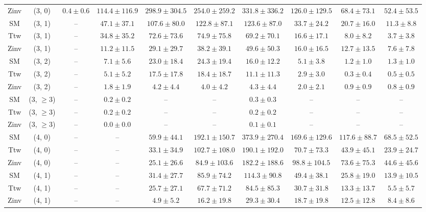 \begin{table}[h!]
{\begin{tabular}{cccccccccc}
	Zinv & (3, 0) & $0.4\pm 0.6$ & $114.4\pm 116.9$ & $298.9\pm 304.5$ & $254.0\pm 259.2$ & $331.8\pm 336.2$ & $126.0\pm 129.5$ & $68.4\pm 73.1$ & $52.4\pm 53.5$ \\[0.5ex] 
	SM & (3, 1) & -- & $47.1\pm 37.1$ & $107.6\pm 80.0$ & $122.8\pm 87.1$ & $123.6\pm 87.0$ & $33.7\pm 24.2$ & $20.7\pm 16.0$ & $11.3\pm 8.8$ \\[0.5ex] 
	Ttw & (3, 1) & -- & $34.8\pm 35.2$ & $72.6\pm 73.6$ & $74.9\pm 75.8$ & $69.2\pm 70.1$ & $16.6\pm 17.1$ & $8.0\pm 8.2$ & $3.7\pm 3.8$ \\[0.5ex] 
	Zinv & (3, 1) & -- & $11.2\pm 11.5$ & $29.1\pm 29.7$ & $38.2\pm 39.1$ & $49.6\pm 50.3$ & $16.0\pm 16.5$ & $12.7\pm 13.5$ & $7.6\pm 7.8$ \\[0.5ex] 
	SM & (3, 2) & -- & $7.1\pm 5.6$ & $23.0\pm 18.4$ & $24.3\pm 19.4$ & $16.0\pm 12.2$ & $5.1\pm 3.8$ & $1.2\pm 1.0$ & $1.3\pm 1.0$ \\[0.5ex] 
	Ttw & (3, 2) & -- & $5.1\pm 5.2$ & $17.5\pm 17.8$ & $18.4\pm 18.7$ & $11.1\pm 11.3$ & $2.9\pm 3.0$ & $0.3\pm 0.4$ & $0.5\pm 0.5$ \\[0.5ex] 
	Zinv & (3, 2) & -- & $1.8\pm 1.9$ & $4.2\pm 4.4$ & $4.0\pm 4.2$ & $4.3\pm 4.4$ & $2.0\pm 2.1$ & $0.9\pm 0.9$ & $0.8\pm 0.9$ \\[0.5ex] 
	SM & (3, $\ge3$) & -- & $0.2\pm 0.2$ & -- & -- & $0.3\pm 0.3$ & -- & -- & -- \\[0.5ex] 
	Ttw & (3, $\ge3$) & -- & $0.2\pm 0.2$ & -- & -- & $0.2\pm 0.2$ & -- & -- & -- \\[0.5ex] 
	Zinv & (3, $\ge3$) & -- & $0.0\pm 0.0$ & -- & -- & $0.1\pm 0.1$ & -- & -- & -- \\[0.5ex] 
	SM & (4, 0) & -- & -- & $59.9\pm 44.1$ & $192.1\pm 150.7$ & $373.9\pm 270.4$ & $169.6\pm 129.6$ & $117.6\pm 88.7$ & $68.5\pm 52.5$ \\[0.5ex] 
	Ttw & (4, 0) & -- & -- & $33.1\pm 34.9$ & $102.7\pm 108.0$ & $190.1\pm 192.0$ & $70.7\pm 73.3$ & $43.9\pm 45.1$ & $23.9\pm 24.7$ \\[0.5ex] 
	Zinv & (4, 0) & -- & -- & $25.1\pm 26.6$ & $84.9\pm 103.6$ & $182.2\pm 188.6$ & $98.8\pm 104.5$ & $73.6\pm 75.3$ & $44.6\pm 45.6$ \\[0.5ex] 
	SM & (4, 1) & -- & -- & $31.4\pm 27.7$ & $85.9\pm 74.2$ & $114.3\pm 90.8$ & $49.4\pm 38.1$ & $25.8\pm 19.0$ & $13.9\pm 10.5$ \\[0.5ex] 
	Ttw & (4, 1) & -- & -- & $25.7\pm 27.1$ & $67.7\pm 71.2$ & $84.5\pm 85.3$ & $30.7\pm 31.8$ & $13.3\pm 13.7$ & $5.5\pm 5.7$ \\[0.5ex] 
	Zinv & (4, 1) & -- & -- & $4.9\pm 5.2$ & $16.2\pm 19.8$ & $29.3\pm 30.4$ & $18.7\pm 19.8$ & $12.5\pm 12.8$ & $8.4\pm 8.6$ \\[0.5ex] 

\end{tabular}}
\end{table}
